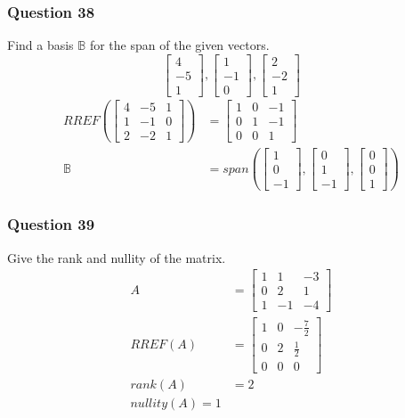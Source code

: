 \documentclass{math}
\begin{document}
\subsubsection*{Question 38}
Find a basis \( \mathbb{B} \) for the span of the given vectors.
\[ \begin{bmatrix}4 \\ -5 \\ 1\end{bmatrix},
  \begin{bmatrix}1 \\ -1 \\ 0\end{bmatrix},
  \begin{bmatrix}2 \\ -2 \\ 1\end{bmatrix} \]
\begin{align*}
  RREF\left(\begin{bmatrix}
    4 & -5 & 1 \\
    1 & -1 & 0 \\
    2 & -2 & 1
  \end{bmatrix}\right) &= \begin{bmatrix}
    1 & 0 & -1 \\
    0 & 1 & -1 \\
    0 & 0 & 1
  \end{bmatrix} \\
  \mathbb{B} &= span\left(
    \begin{bmatrix}1 \\ 0 \\ -1\end{bmatrix},
    \begin{bmatrix}0 \\ 1 \\ -1\end{bmatrix},
    \begin{bmatrix}0 \\ 0 \\ 1\end{bmatrix}
  \right)
\end{align*}

\subsubsection*{Question 39}
Give the rank and nullity of the matrix.
\begin{align*}
  A &= \begin{bmatrix}
    1 & 1 & -3 \\
    0 & 2 & 1 \\
    1 & -1 & -4
  \end{bmatrix} \\
  RREF(A) &= \begin{bmatrix}
    1 & 0 & -\frac{7}{2} \\
    0 & 2 & \frac{1}{2} \\
    0 & 0 & 0
  \end{bmatrix} \\
  rank(A) &= 2 \\
  nullity(A) = 1
\end{align*}
\end{document}
